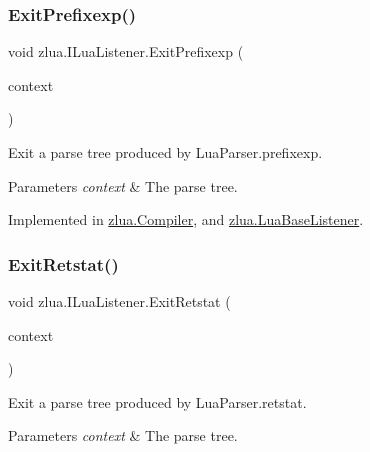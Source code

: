 \subsubsection{\texorpdfstring{Exit\+Prefixexp()}{ExitPrefixexp()}}
{\footnotesize\ttfamily void zlua.\+I\+Lua\+Listener.\+Exit\+Prefixexp (\begin{DoxyParamCaption}\item[{\mbox{[}\+Not\+Null\mbox{]} \mbox{\hyperlink{classzlua_1_1_lua_parser_1_1_prefixexp_context}{Lua\+Parser.\+Prefixexp\+Context}}}]{context }\end{DoxyParamCaption})}



Exit a parse tree produced by Lua\+Parser.\+prefixexp. 


\begin{DoxyParams}{Parameters}
{\em context} & The parse tree.\\
\hline
\end{DoxyParams}


Implemented in \mbox{\hyperlink{classzlua_1_1_compiler_aaed669e9529c2da870c27a0c3569651f}{zlua.\+Compiler}}, and \mbox{\hyperlink{classzlua_1_1_lua_base_listener_a2d2173a2484aac9cb7e09010ca3170e9}{zlua.\+Lua\+Base\+Listener}}.

\mbox{\label{interfacezlua_1_1_i_lua_listener_a4f4bc76c085e375c69f6c34491670d9e}} 
\subsubsection{\texorpdfstring{Exit\+Retstat()}{ExitRetstat()}}
{\footnotesize\ttfamily void zlua.\+I\+Lua\+Listener.\+Exit\+Retstat (\begin{DoxyParamCaption}\item[{\mbox{[}\+Not\+Null\mbox{]} \mbox{\hyperlink{classzlua_1_1_lua_parser_1_1_retstat_context}{Lua\+Parser.\+Retstat\+Context}}}]{context }\end{DoxyParamCaption})}



Exit a parse tree produced by Lua\+Parser.\+retstat. 


\begin{DoxyParams}{Parameters}
{\em context} & The parse tree.\\
\hline
\end{DoxyParams}


